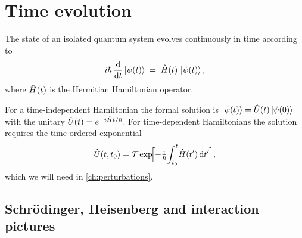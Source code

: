\section{Time evolution}
\label{sec:time-evolution}

\begin{postulate}
\label{post:schrodinger}
The state of an isolated quantum system evolves continuously in
time according to
\begin{equation}
\label{eq:schrodinger}
i\hbar\,\dv{t}\ket{\psi(t)} \;=\; \hat{H}(t)\,\ket{\psi(t)},
\end{equation}
where $\hat{H}(t)$ is the Hermitian Hamiltonian operator.
\end{postulate}

For a time-independent Hamiltonian the formal solution is
$\ket{\psi(t)}=\hat{U}(t)\ket{\psi(0)}$ with the unitary
$\hat{U}(t)=e^{-i\hat{H}t/\hbar}$. For time-dependent Hamiltonians
the solution requires the time-ordered exponential
\begin{equation}
\hat{U}(t,t_0) = \mathcal{T}\exp\!\Bigl[-\tfrac{i}{\hbar}\!\int_{t_0}^t\!\hat{H}(t')\,\dd t'\Bigr],
\end{equation}
which we will need in \cref{ch:perturbations}.

\subsection{Schr\"odinger, Heisenberg and interaction pictures}
\label{sec:pictures}

